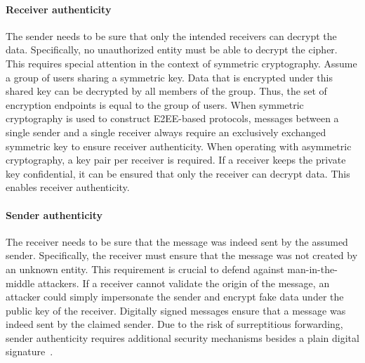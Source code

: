 \documentclass[../main.tex]{subfiles}
\begin{document}
\paragraph{Receiver authenticity}
    The sender needs to be sure that only the intended receivers can decrypt the data.
    Specifically, no unauthorized entity must be able to decrypt the cipher.
    This requires special attention in the context of symmetric cryptography.
    Assume a group of users sharing a symmetric key.
    Data that is encrypted under this shared key can be decrypted by all members of the group.
    Thus, the set of encryption endpoints is equal to the group of users.
    When symmetric cryptography is used to construct E2EE-based protocols, messages between a single sender and a single receiver always require an exclusively exchanged symmetric key to ensure receiver authenticity.
    When operating with asymmetric cryptography, a key pair per receiver is required.
    If a receiver keeps the private key confidential, it can be ensured that only the receiver can decrypt data.
    This enables receiver authenticity.
\paragraph{Sender authenticity} 
    The receiver needs to be sure that the message was indeed sent by the assumed sender.
    Specifically, the receiver must ensure that the message was not created by an unknown entity.
    This requirement is crucial to defend against man-in-the-middle attackers.
    If a receiver cannot validate the origin of the message, an attacker could simply impersonate the sender and encrypt fake data under the public key of the receiver.
    Digitally signed messages ensure that a message was indeed sent by the claimed sender.
    Due to the risk of surreptitious forwarding, sender authenticity requires additional security mechanisms besides a plain digital signature~\cite{Davis2001}.
\end{document}
